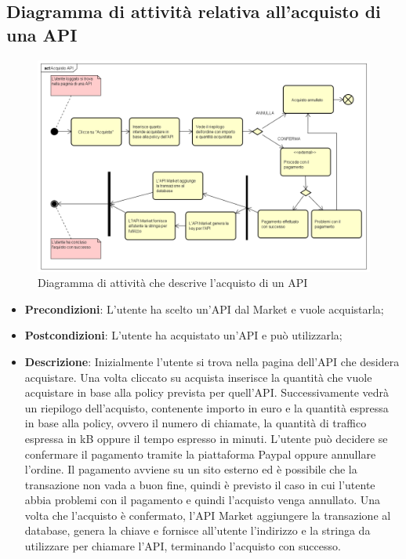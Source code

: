 \newpage
\subsection{Diagramma di attività relativa all'acquisto di una API}
\begin{figure}[h]
	\centering
	\includegraphics[width=1.0\linewidth]{IMG/Acquisto_API}
	\caption{Diagramma di attività che descrive l'acquisto di un API}
	\label{fig:acquistoapi}
\end{figure}

\begin{itemize}
	\item \textbf{Precondizioni}: L'utente ha scelto un'API dal Market e vuole acquistarla;
	\item \textbf{Postcondizioni}: L'utente ha acquistato un'API e può utilizzarla;
	\item \textbf{Descrizione}: Inizialmente l'utente si trova nella pagina dell'API che desidera acquistare. Una volta cliccato su acquista inserisce la quantità che vuole acquistare in base alla policy prevista per quell'API. Successivamente vedrà un riepilogo dell'acquisto, contenente importo in euro e la quantità espressa in base alla policy, ovvero il numero di chiamate, la quantità di traffico espressa in kB oppure il tempo espresso in minuti. L'utente può decidere se confermare il pagamento tramite la piattaforma Paypal oppure annullare l'ordine. Il pagamento avviene su un sito esterno ed è possibile che la transazione non vada a buon fine, quindi è previsto il caso in cui l'utente abbia problemi con il pagamento e quindi l'acquisto venga annullato. Una volta che l'acquisto è confermato, l'API Market aggiungere la transazione al database, genera la chiave e fornisce all'utente l'indirizzo e la stringa da utilizzare per chiamare l'API, terminando l'acquisto con successo. 
\end{itemize}

